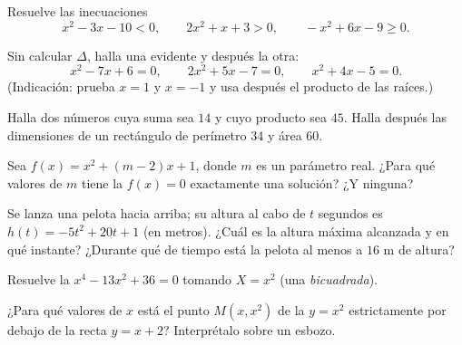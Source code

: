\begin{exercise}[$\star$]\label{exo:g11:quad:3}
Resuelve las inecuaciones
\[
x^2 - 3x - 10 < 0, \qquad
2x^2 + x + 3 > 0, \qquad
-x^2 + 6x - 9 \geq 0 .
\]
\end{exercise}

\begin{exercise}[$\star$]\label{exo:g11:quad:4}
Sin calcular $\Delta$, halla una  evidente y después la otra:
\[
x^2 - 7x + 6 = 0, \qquad
2x^2 + 5x - 7 = 0, \qquad
x^2 + 4x - 5 = 0 .
\]
(Indicación: prueba $x = 1$ y $x = -1$ y usa después el producto de las
raíces.)
\end{exercise}

\begin{exercise}[$\star\star$]\label{exo:g11:quad:5}
Halla dos números cuya suma sea $14$ y cuyo producto sea $45$. Halla
después las dimensiones de un rectángulo de perímetro $34$ y área $60$.
\end{exercise}

\begin{exercise}[$\star\star$]\label{exo:g11:quad:6}
Sea $f(x) = x^2 + (m-2)x + 1$, donde $m$ es un parámetro real. ¿Para qué
valores de $m$ tiene la  $f(x) = 0$ exactamente una solución? ¿Y
ninguna?
\end{exercise}

\begin{exercise}[$\star\star$]\label{exo:g11:quad:7}
Se lanza una pelota hacia arriba; su altura al cabo de $t$ segundos es
$h(t) = -5t^2 + 20t + 1$ (en metros). ¿Cuál es la altura máxima alcanzada
y en qué instante? ¿Durante qué  de tiempo está la pelota al
menos a $16$ m de altura?
\end{exercise}

\begin{exercise}[$\star\star$]\label{exo:g11:quad:8}
Resuelve la  $x^4 - 13x^2 + 36 = 0$ tomando $X = x^2$ (una
 \emph{bicuadrada}).
\end{exercise}

\begin{exercise}[$\star\star$]\label{exo:g11:quad:9}
¿Para qué valores de $x$ está el punto $M(x, x^2)$ de la 
$y = x^2$ estrictamente por debajo de la recta $y = x + 2$? Interprétalo
sobre un esbozo.
\end{exercise}

